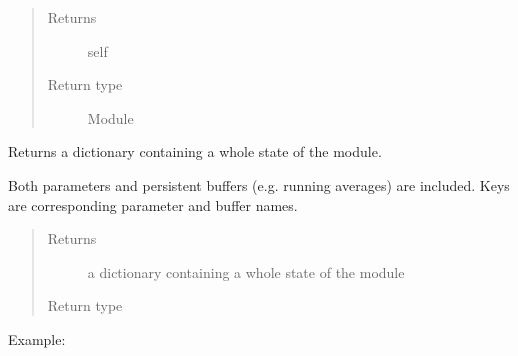 \documentclass[letterpaper,10pt,english]{sphinxmanual}
\begin{document}
\begin{fulllineitems}
\begin{fulllineitems}
\begin{quote}
\begin{description}
\item[{Returns}] \leavevmode
self

\item[{Return type}] \leavevmode
Module

\end{description}\end{quote}

\end{fulllineitems}


\begin{fulllineitems}
\label{\detokenize{api/dynamics:geology.metamodelling.dynamics.NeuralDifferentialEquation.share_memory}}
\end{fulllineitems}


\begin{fulllineitems}
\label{\detokenize{api/dynamics:geology.metamodelling.dynamics.NeuralDifferentialEquation.state_dict}}
Returns a dictionary containing a whole state of the module.

Both parameters and persistent buffers (e.g. running averages) are
included. Keys are corresponding parameter and buffer names.
\begin{quote}\begin{description}
\item[{Returns}] \leavevmode
a dictionary containing a whole state of the module

\item[{Return type}] \leavevmode
{}

\end{description}\end{quote}

Example:

\begin{sphinxVerbatim}[commandchars=\\\{\}]
\end{sphinxVerbatim}


\end{fulllineitems}
\end{fulllineitems}
\end{document}
